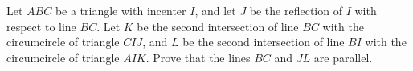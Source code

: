 Let $ABC$ be a triangle with incenter $I$, and let $J$ be the reflection of $I$ with respect to line $BC$.
Let $K$ be the second intersection of line $BC$ with the circumcircle of triangle $CIJ$,
and $L$ be the second intersection of line $BI$ with the circumcircle of triangle $AIK$.
Prove that the lines $BC$ and $JL$ are parallel.
